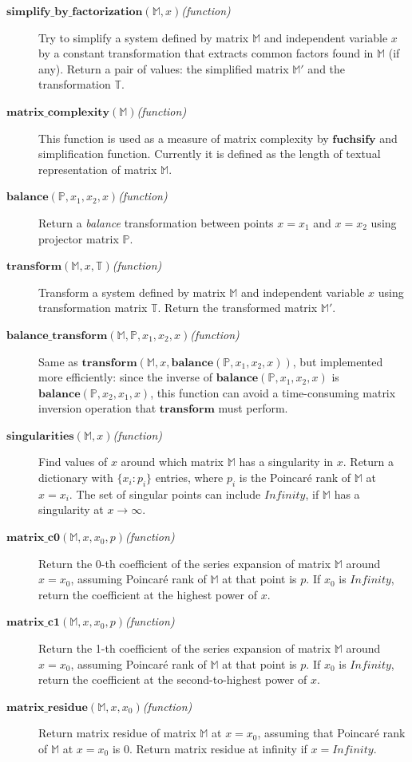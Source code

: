 \documentclass[12pt,a4paper]{article}
\def\F#1{\mathbf{#1}} %
\def\M#1{\mathbb{#1}} %
\def\functionitem#1#2{\item[$\F{#1}(#2)$\hfill\textit{(function)}]}
\begin{document}
\begin{description}
\functionitem{simplify\_by\_factorization}{\M M, x}
Try to simplify a system defined by matrix $\M M$ and independent variable $x$ by a constant transformation that extracts common factors found in $\M M$ (if any).
Return a pair of values: the simplified matrix $\M M'$ and the transformation $\M T$.

\functionitem{matrix\_complexity}{\M M}
This function is used as a measure of matrix complexity by $\F{fuchsify}$ and simplification function.
Currently it is defined as the length of textual representation of matrix $\M M$.

\functionitem{balance}{\M P, x_1, x_2, x}
Return a \textit{balance} transformation between points $x=x_1$ and $x=x_2$ using projector matrix $\M P$.

\functionitem{transform}{\M M, x, \M T}
Transform a system defined by matrix $\M M$ and independent variable $x$ using transformation matrix $\M T$.
Return the transformed matrix $\M M'$.

\functionitem{balance\_transform}{\M M, \M P, x_1, x_2, x}
Same as $\F{transform}(\M M, x, \F{balance}(\M P, x_1, x_2, x))$, but implemented more efficiently: since the inverse of $\F{balance}(\M P, x_1, x_2, x)$ is $\F{balance}(\M P, x_2, x_1, x)$, this function can avoid a time-consuming matrix inversion operation that $\F{transform}$ must perform.

\functionitem{singularities}{\M M, x}
Find values of $x$ around which matrix $\M M$ has a singularity in $x$.
Return a dictionary with $\{x_i: p_i\}$ entries, where $p_i$ is the Poincar\'e rank of $\M M$ at $x=x_i$.
The set of singular points can include $Infinity$, if $\M M$ has a singularity at $x\to\infty$.

\functionitem{matrix\_c0}{\M M, x, x_0, p}
Return the 0-th coefficient of the series expansion of matrix $\M M$ around $x=x_0$, assuming Poincar\'e rank of $\M M$ at that point is $p$.
If $x_0$ is $Infinity$, return the coefficient at the highest power of $x$.

\functionitem{matrix\_c1}{\M M, x, x_0, p}
Return the 1-th coefficient of the series expansion of matrix $\M M$ around $x=x_0$, assuming Poincar\'e rank of $\M M$ at that point is $p$.
If $x_0$ is $Infinity$, return the coefficient at the second-to-highest power of $x$.

\functionitem{matrix\_residue}{\M M, x, x_0}
Return matrix residue of matrix $\M M$ at $x=x_0$, assuming that Poincar\'e rank of $\M M$ at $x=x_0$ is $0$.
Return matrix residue at infinity if $x=Infinity$.


\end{description}
\end{document}
